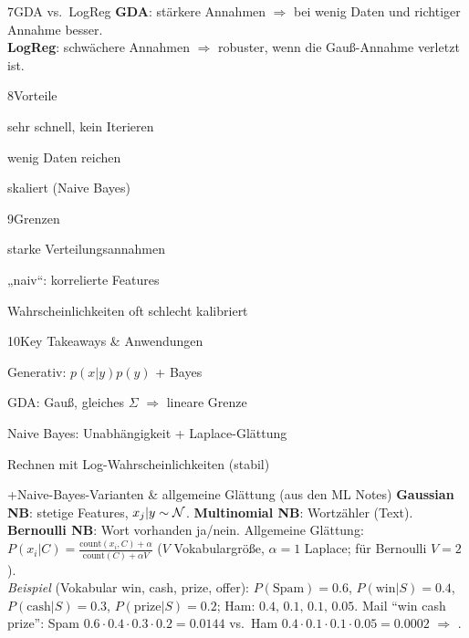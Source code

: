 \begin{hngrid}
\begin{hnp}[raster multicolumn=2,acc=hnpurple]{7}{GDA vs.\ LogReg}
\textbf{GDA}: stärkere Annahmen $\Rightarrow$ bei wenig Daten und richtiger Annahme besser.\\
\textbf{LogReg}: schwächere Annahmen $\Rightarrow$ robuster, wenn die Gauß-Annahme verletzt ist.
\end{hnp}
%
\begin{hnp}[raster multicolumn=2,acc=hngreen]{8}{Vorteile}
\begin{hnpro}
\item sehr schnell, kein Iterieren
\item wenig Daten reichen
\item skaliert (Naive Bayes)
\end{hnpro}
\end{hnp}
%
\begin{hnp}[raster multicolumn=2,acc=hnred]{9}{Grenzen}
\begin{hncon}
\item starke Verteilungsannahmen
\item „naiv“: korrelierte Features
\item Wahrscheinlichkeiten oft schlecht kalibriert
\end{hncon}
\end{hnp}
%
\begin{hnp}[raster multicolumn=6,acc=hnorange]{10}{Key Takeaways \& Anwendungen}
\begin{hnchk}
\item Generativ: $p(x|y)p(y)$ + Bayes
\item GDA: Gauß, gleiches $\Sigma$ $\Rightarrow$ lineare Grenze
\item Naive Bayes: Unabhängigkeit + Laplace-Glättung
\item Rechnen mit Log-Wahrscheinlichkeiten (stabil)
\end{hnchk}
\end{hnp}
%
\begin{hnp}[raster multicolumn=6,acc=hnteal]{+}{Naive-Bayes-Varianten \& allgemeine Glättung (aus den ML Notes)}
\textbf{Gaussian NB}: stetige Features, $x_j|y\sim\mathcal{N}$. \textbf{Multinomial NB}: Wortzähler (Text). \textbf{Bernoulli NB}: Wort vorhanden ja/nein. Allgemeine Glättung: $P(x_i|C)=\frac{\mathrm{count}(x_i,C)+\alpha}{\mathrm{count}(C)+\alpha V}$ ($V$ Vokabulargröße, $\alpha{=}1$ Laplace; für Bernoulli $V{=}2$).\\
\emph{Beispiel} (Vokabular win, cash, prize, offer): $P(\text{Spam})=0.6$, $P(\text{win}|S)=0.4$, $P(\text{cash}|S)=0.3$, $P(\text{prize}|S)=0.2$; Ham: $0.4,\,0.1,\,0.1,\,0.05$. Mail ``win cash prize'': Spam $0.6\cdot0.4\cdot0.3\cdot0.2=0.0144$ vs.\ Ham $0.4\cdot0.1\cdot0.1\cdot0.05=0.0002$ $\Rightarrow$ .

\end{hnp}
\end{hngrid}
